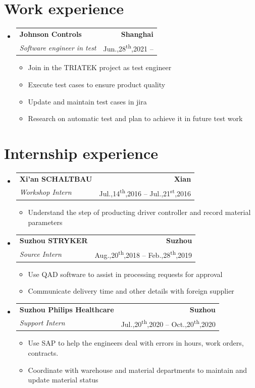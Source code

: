 \documentclass[A4,11pt]{article}
\makeatletter
\newcommand{\CVItem}[1]{
  \item\small{
    {#1 \vspace{-2pt}}
  }
}
\newcommand{\CVSubheading}[4]{
  \vspace{-2pt}\item
    \begin{tabular*}{0.97\textwidth}[t]{l@{\extracolsep{\fill}}r}
      \textbf{#1} & #2 \\
      \small#3 & \small #4 \\
    \end{tabular*}\vspace{-7pt}
}
\newcommand{\CVSubHeadingListStart}{\begin{itemize}[leftmargin=0.5cm, label={}]}
\newcommand{\CVSubHeadingListEnd}{\end{itemize}}
\newcommand{\CVItemListStart}{\begin{itemize}}
\newcommand{\CVItemListEnd}{\end{itemize}\vspace{-5pt}}
\makeatother
\begin{document}
\section{Work experience}
  \CVSubHeadingListStart
    \CVSubheading
      {Johnson Controls}{\textbf{Shanghai}}
      {\textit{Software engineer in test}}{Jun.,28\textsuperscript{th},2021 --  }
      \CVItemListStart
        \CVItem{Join in the TRIATEK project as test engineer}
        \CVItem{Execute test cases to ensure product quality}
        \CVItem{Update and maintain test cases in jira}
        \CVItem{Research on automatic test and plan to achieve it in future test work}
      \CVItemListEnd
   \CVSubHeadingListEnd

\section{Internship experience}
  \CVSubHeadingListStart
    \CVSubheading
      {Xi'an SCHALTBAU}{\textbf{Xian}}
      {\textit{Workshop Intern}}{Jul.,14\textsuperscript{th},2016 --  Jul.,21\textsuperscript{st},2016}
      \CVItemListStart
        \CVItem{Understand the step of producting driver controller and record material parameters}
      \CVItemListEnd
    \CVSubheading
      {Suzhou STRYKER}{\textbf{Suzhou}}
      {\textit{Source Intern}}{Aug.,20\textsuperscript{th},2018 --  Feb.,28\textsuperscript{th},2019}
      \CVItemListStart
        \CVItem{Use QAD software to assist in processing requests for approval}
        \CVItem{Communicate delivery time and other details with foreign supplier}
      \CVItemListEnd
   \CVSubheading
      {Suzhou Philips Healthcare}{\textbf{Suzhou}}
      {\textit{Support Intern}}{Jul.,20\textsuperscript{th},2020 --  Oct.,20\textsuperscript{th},2020}
      \CVItemListStart
        \CVItem{Use SAP to help the engineers deal with errors in hours, work orders, contracts.}
        \CVItem{Coordinate with warehouse and material departments to maintain and update material status}
    \CVItemListEnd
  \CVSubHeadingListEnd  
  
\end{document}
